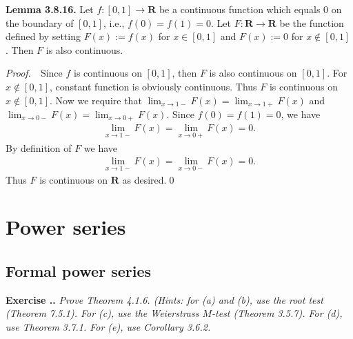 \documentclass{book}
\newcommand{\pff}{\vspace{.25em}\noindent\emph{Proof.}~~}
\newcommand{\titl}[1]{\noindent\textbf{#1}}
\newcounter{Exercise}[section]
\renewcommand{\theExercise}{\thesection.\arabic{Exercise}.}
\newcommand{\new}{\vspace{1.5em}\noindent\textbf{Exercise \stepcounter{Exercise}\textbf{\theExercise}} }
\begin{document}
\begin{framed}
\titl{Lemma 3.8.16.} Let $f : [0, 1] \to \mathbf{R}$ be a continuous function which equals $0$ on the boundary of $[0, 1]$, i.e., $f(0) = f(1) = 0$. Let $F : \mathbf{R} \to \mathbf{R}$ be the function defined by setting $F(x) := f(x)$ for $x \in [0, 1]$ and $F(x) := 0$ for $x \notin [0, 1]$. Then $F$ is also continuous.
\end{framed}

\pff Since $f$ is continuous on $[0, 1]$, then $F$ is also continuous on $[0, 1]$. For $x \notin [0, 1]$, constant function is obviously continuous. Thus $F$ is continuous on $x \notin [0, 1]$. Now we require that $\lim_{x \to 1-} F(x) = \lim_{x \to 1+} F(x)$ and $\lim_{x \to 0-} F(x) = \lim_{x \to 0+} F(x)$. Since $f(0) = f(1) =0$, we have
    \begin{align*}
        \lim_{x \to 1-} F(x) = \lim_{x \to 0+} F(x) = 0.
    \end{align*}
By definition of $F$ we have
    \begin{align*}
        \lim_{x \to 1-} F(x) = \lim_{x \to 0-} F(x) = 0.
    \end{align*}
Thus $F$ is continuous on $\mathbf{R}$ as desired.\qed


\chapter{Power series}

\section{Formal power series}

\new\emph{Prove Theorem 4.1.6. (Hints: for (a) and (b), use the root test (Theorem 7.5.1). For (c), use the Weierstrass $M$-test (Theorem 3.5.7). For (d), use Theorem 3.7.1. For (e), use Corollary 3.6.2.}
\end{document}
